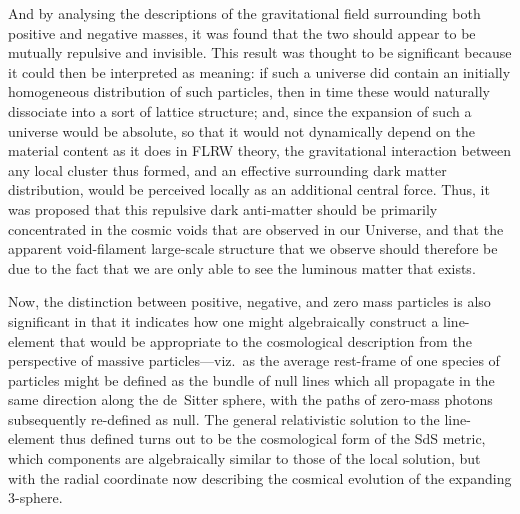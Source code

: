And by analysing the descriptions of the gravitational field surrounding both positive and negative masses, it was found that the two should appear to be mutually repulsive and invisible. This result was thought to be significant because it could then be interpreted as meaning: if such a universe did contain an initially homogeneous distribution of such particles, then in time these would naturally dissociate into a sort of lattice structure; and, since the expansion of such a universe would be absolute, so that it would not dynamically depend on the material content as it does in FLRW theory, the gravitational interaction between any local cluster thus formed, and an effective surrounding dark matter distribution, would be perceived locally as an additional central force. Thus, it was proposed that this repulsive dark anti-matter should be primarily concentrated in the cosmic voids that are observed in our Universe, and that the apparent void-filament large-scale structure that we observe should therefore be due to the fact that we are only able to see the luminous matter that exists.

Now, the distinction between positive, negative, and zero mass particles is also significant in that it indicates how one might algebraically construct a line-element that would be appropriate to the cosmological description from the perspective of massive particles---viz.\ as the average rest-frame of one species of particles might be defined as the bundle of null lines which all propagate in the same direction along the de~Sitter sphere, with the paths of zero-mass photons subsequently re-defined as null. The general relativistic solution to the line-element thus defined turns out to be the cosmological form of the SdS metric, which components are algebraically similar to those of the local solution, but with the radial coordinate now describing the cosmical evolution of the expanding 3-sphere.

